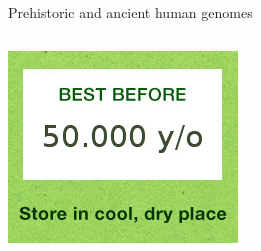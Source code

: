 \documentclass[10pt]{beamer}
\begin{document}
\begin{frame}{Prehistoric and ancient human genomes}
\begin{columns}
\begin{column}{0.25\textwidth}
\begin{center}
		\includegraphics[width=\textwidth]{./figures/bestbefore.jpg}
	\end{center}
\end{column}
\end{columns}
\end{frame}
\end{document}
